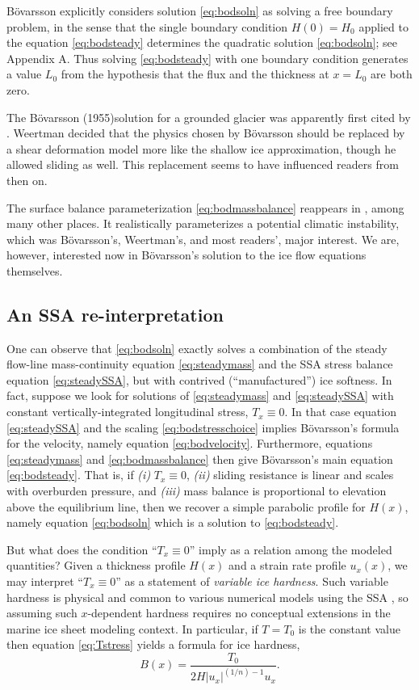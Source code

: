 \documentclass[review,letterpaper]{igs}
\renewcommand{\dh}{\fontencoding{T1}\selectfont{\symbol{240}}}
\newcommand{\bod}{B\"o\dh varsson\xspace}
\newcommand{\citebod}{B\"o\dh varsson (1955)\nocite{Bodvardsson}}
\begin{document}
\bod explicitly considers solution \eqref{eq:bodsoln} as solving a free boundary problem, in the sense that the single boundary condition $H(0)=H_0$ applied to the equation \eqref{eq:bodsteady} determines the quadratic solution \eqref{eq:bodsoln}; see Appendix A.  Thus solving \eqref{eq:bodsteady} with one boundary condition generates a value $L_0$ from the hypothesis that the flux and the thickness at $x=L_0$ are both zero.

The \citebod solution for a grounded glacier was apparently first cited by \cite{Weertman61stability}.  Weertman decided that the physics chosen by \bod should be replaced by a shear deformation model more like the shallow ice approximation, though he allowed sliding as well.  This replacement seems to have influenced readers from then on.

The surface balance parameterization \eqref{eq:bodmassbalance} reappears in \cite{Weertman61stability}, among many other places.  It realistically parameterizes a potential climatic instability, which was \bod's, Weertman's, and most readers', major interest.  We are, however, interested now in \bod's solution to the ice flow equations themselves.


\subsection*{An SSA re-interpretation}  One can observe that \eqref{eq:bodsoln} exactly solves a combination of the steady flow-line mass-continuity equation \eqref{eq:steadymass} and the SSA stress balance equation \eqref{eq:steadySSA}, but with contrived (``manufactured'') ice softness.  In fact, suppose we look for solutions of \eqref{eq:steadymass} and \eqref{eq:steadySSA} with constant vertically-integrated longitudinal stress, $T_x \equiv 0$.  In that case equation \eqref{eq:steadySSA} and the scaling \eqref{eq:bodstresschoice} implies \bod's formula for the velocity, namely equation \eqref{eq:bodvelocity}.  Furthermore, equations \eqref{eq:steadymass} and \eqref{eq:bodmassbalance} then give \bod's main equation \eqref{eq:bodsteady}.  That is, if \emph{(i)} $T_x \equiv 0$, \emph{(ii)} sliding resistance is linear and scales with overburden pressure, and \emph{(iii)} mass balance is proportional to elevation above the equilibrium line, then we recover a simple parabolic profile for $H(x)$, namely equation \eqref{eq:bodsoln} which is a solution to \eqref{eq:bodsteady}.

But what does the condition ``$T_x\equiv 0$'' imply as a relation among the modeled quantities?  Given a thickness profile $H(x)$ and a strain rate profile $u_x(x)$, we may interpret ``$T_x\equiv 0$'' as a statement of \emph{variable ice hardness}.  Such variable hardness is physical and common to various numerical models using the SSA \citep[for example]{BBssasliding}, so assuming such $x$-dependent hardness requires no conceptual extensions in the marine ice sheet modeling context.  In particular, if $T=T_0$ is the constant value then equation \eqref{eq:Tstress} yields a formula for ice hardness,
\begin{equation}
B(x) = \frac{T_0}{2 H |u_x|^{(1/n)-1} u_x}. \label{eq:hardnessdefine}
\end{equation}
\end{document}
